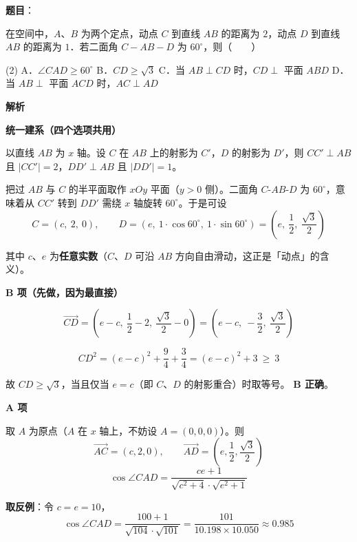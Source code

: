 \begin{answer}

\textbf{题目}：

在空间中，$A$、$B$ 为两个定点，动点 $C$ 到直线 $AB$ 的距离为 $2$，动点 $D$ 到直线 $AB$ 的距离为 $1$．若二面角 $C-AB-D$ 为 $60^\circ$，则\mbox{（　　）}

\begin{gkopts}(2)
\task A．$\angle CAD\ge 60^\circ$
\task B．$CD\ge\sqrt{3}$
\task C．当 $AB\perp CD$ 时，$CD\perp$ 平面 $ABD$
\task D．当 $AB\perp$ 平面 $ACD$ 时，$AC\perp AD$
\end{gkopts}

\textbf{解析}

\textbf{统一建系（四个选项共用）}

以直线 $AB$ 为 $x$ 轴。设 $C$ 在 $AB$ 上的射影为 $C'$，$D$ 的射影为 $D'$，则 $CC'\perp AB$ 且 $|CC'|=2$，$DD'\perp AB$ 且 $|DD'|=1$。

把过 $AB$ 与 $C$ 的半平面取作 $xOy$ 平面（$y>0$ 侧）。二面角 $C\text{-}AB\text{-}D$ 为 $60^\circ$，意味着从 $CC'$ 转到 $DD'$ 需绕 $x$ 轴旋转 $60^\circ$。于是可设
\nopagebreak[4]
\[C=(c,\ 2,\ 0),\qquad D=\left(e,\ 1\cdot\cos60^\circ,\ 1\cdot\sin60^\circ\right)=\left(e,\ \frac12,\ \frac{\sqrt3}{2}\right)\]

其中 $c$、$e$ 为\textbf{任意实数}（$C$、$D$ 可沿 $AB$ 方向自由滑动，这正是「动点」的含义）。

\par\medskip

\textbf{B 项（先做，因为最直接）}

\nopagebreak[4]
\[\overrightarrow{CD}=\left(e-c,\ \frac12-2,\ \frac{\sqrt3}{2}-0\right)=\left(e-c,\ -\frac32,\ \frac{\sqrt3}{2}\right)\]

\nopagebreak[4]
\[CD^2=(e-c)^2+\frac94+\frac34=(e-c)^2+3\ \ge\ 3\]

故 $CD\ge\sqrt3$，当且仅当 $e=c$（即 $C$、$D$ 的射影重合）时取等号。 \textbf{B 正确}。

\par\medskip

\textbf{A 项}

取 $A$ 为原点（$A$ 在 $x$ 轴上，不妨设 $A=(0,0,0)$）。则
\nopagebreak[4]
\[\overrightarrow{AC}=(c,2,0),\qquad \overrightarrow{AD}=\left(e,\frac12,\frac{\sqrt3}{2}\right)\]
\nopagebreak[4]
\[\cos\angle CAD=\frac{ce+1}{\sqrt{c^2+4}\cdot\sqrt{e^2+1}}\]

\textbf{取反例}：令 $c=e=10$，
\nopagebreak[4]
\[\cos\angle CAD=\frac{100+1}{\sqrt{104}\cdot\sqrt{101}}=\frac{101}{10.198\times10.050}\approx 0.985\]


\end{answer}
